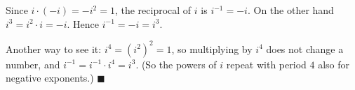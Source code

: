 Since $i\cdot(-i)=-i^2=1$, the reciprocal of $i$ is $i^{-1}=-i$. On the other hand $i^3=i^2\cdot i=-i$. Hence $i^{-1}=-i=i^3$.

Another way to see it: $i^4=(i^2)^2=1$, so multiplying by $i^4$ does not change a number, and $i^{-1}=i^{-1}\cdot i^4=i^3$. (So the powers of $i$ repeat with period $4$ also for negative exponents.) $\blacksquare$
